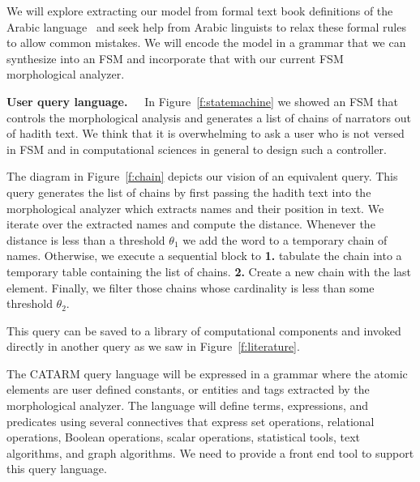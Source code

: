 \documentclass[12pt]{article}
\begin{document}
We will explore extracting our model from formal text book
definitions of the Arabic language~\cite{Abd00,Abd001} and seek
help from Arabic linguists to relax these formal rules to
allow common mistakes. 
We will encode the model in a grammar that we can synthesize
into an FSM and incorporate that with our current FSM 
morphological analyzer. 


{\bf User query language.~~}
In Figure~\ref{f:statemachine} we showed an FSM 
that controls the morphological analysis and generates a
list of chains of narrators out of hadith text.
We think that it is overwhelming to ask a user who is not 
versed in FSM and in computational sciences in general 
to design such a controller. 

The diagram in Figure~\ref{f:chain} depicts our vision of 
an equivalent query.
This query generates the list of chains by first passing the 
hadith text into the morphological analyzer which 
extracts names and their position in text. 
We iterate over the extracted names and compute the distance.
Whenever the distance is less than a threshold $\theta_1$
we add the word to a temporary chain of names. 
Otherwise, we execute a sequential block to 
{\bf 1.} tabulate the chain into a temporary table containing 
the list of chains. 
{\bf 2.} Create a new chain with the last element.
Finally, we filter those chains whose cardinality 
is less than some threshold  $\theta_2$.

This query can be saved to a library of computational components
and invoked directly in another query 
as we saw in Figure~\ref{f:literature}.

\begin{figure}
\end{figure}

The CATARM query language will be expressed in a grammar 
where the atomic elements are user defined constants, or
entities and tags extracted by the morphological analyzer. 
The language will define terms, expressions, and predicates
using several connectives that express set operations, 
relational operations, Boolean operations, scalar operations, 
statistical tools, text algorithms, and graph algorithms. 
We need to provide a front end tool to support this query
language.
\end{document}
